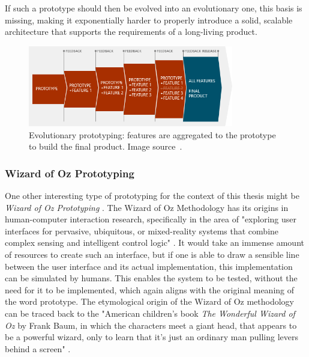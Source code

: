 If such a prototype should then be evolved into an evolutionary one, this basis is missing, making it exponentially harder to properly introduce a solid, scalable architecture that supports the requirements of a long-living product.
%
\begin{figure}
    \centering
    \includegraphics[width=0.8\textwidth]{images/evolutionary-prototyping}
    \caption{Evolutionary prototyping: features are aggregated to the prototype to build the final product. Image source~\cite{mourzenko_why_2014}.}
    \label{fig:evolutionary-prototyping}
\end{figure}

\subsubsection{Wizard of Oz Prototyping}
\label{subsub:wizard-of-oz-prototyping}
One other interesting type of prototyping for the context of this thesis might be \emph{Wizard of Oz Prototyping} \cite{dow_wizard_2005}.
The Wizard of Oz Methodology has its origins in human-computer interaction research, specifically in the area of "exploring user interfaces for pervasive, ubiquitous,
or mixed-reality systems that combine complex sensing and intelligent control logic" \cite{dow_wizard_2005}.
It would take an immense amount of resources to create such an interface, but if one is able to draw a sensible line between the user interface and its actual implementation, this implementation can be simulated by humans.
This enables the system to be tested, without the need for it to be implemented, which again aligns with the original meaning of the word prototype.
The etymological origin of the Wizard of Oz methodology can be traced back to the "American children's book \emph{The Wonderful Wizard of Oz} by Frank Baum, in which the characters meet a giant head, that appears to be a powerful wizard, only to learn that it’s just an ordinary man pulling levers behind a screen" \cite{ramaswamy_wizard_2022}.



